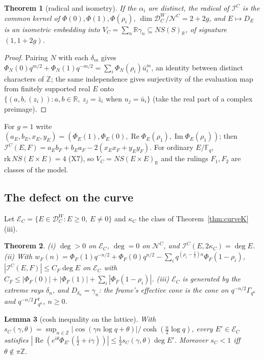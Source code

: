 \documentclass[11pt]{amsart}
\newtheorem{theorem}{Theorem}[section]
\newtheorem{lemma}[theorem]{Lemma}
\theoremstyle{definition}
\theoremstyle{remark}
\newcommand{\R}{\mathbb R}
\newcommand{\Z}{\mathbb Z}
\newcommand{\F}{\mathbb F}
\newcommand{\Rel}{\operatorname{Re}}
\newcommand{\Iml}{\operatorname{Im}}
\newcommand{\DW}{\mathcal D^{W}}
\newcommand{\Nr}{\mathcal N}
\newcommand{\Ef}{\mathcal E}
\newcommand{\I}{\mathcal I}
\newcommand{\dg}{\deg}
\newcommand{\Kc}{\kappa_C}
\begin{document}
\begin{theorem}[radical and isometry]\label{thm:curverad}
If the $\alpha_i$ are distinct, the radical of $\I^C$ is the common kernel of $\Phi(0),\Phi(1),\Phi(\rho_i)$,
$\dim\DW_C/\Nr^C=2+2g$, and $E\mapsto D_E$ is an isometric embedding into $V_C=\sum_n\R\gamma_n\subseteq NS(S)_\R$,
of signature $(1,1+2g)$.
\end{theorem}
\begin{proof}
Pairing $N$ with each $\delta_m$ gives $\Phi_N(0)q^{m/2}+\Phi_N(1)q^{-m/2}=\sum_i\Phi_N(\rho_i)\bar u_i^m$, an identity
between distinct characters of $\Z$; the same independence gives surjectivity of the evaluation map from finitely supported real $E$ onto $\{(a,b,(z_i)):a,b\in\R,\ z_j=\bar z_i\text{ when }u_j=\bar u_i\}$ (take the real part of a complex preimage).
\end{proof}

For $g=1$ write $(a_E,b_E,x_E,y_E)=(\Phi_E(1),\Phi_E(0),\Rel\Phi_E(\rho_1),\Iml\Phi_E(\rho_1))$; then
$\I^C(E,F)=a_Eb_F+b_Ea_F-2(x_Ex_F+y_Ey_F)$. For ordinary $E/\F_q$, $\mathrm{rk}\,NS(E\times E)=4$ (X7), so
$V_C=NS(E\times E)_\R$ and the rulings $F_1,F_2$ are classes of the model.

\subsection{The defect on the curve}
Let $\Ef_C=\{E\in\DW_C:E\ge0,\ E\ne0\}$ and $\Kc$ the class of Theorem~\ref{thm:curveK}(iii).

\begin{theorem}\label{thm:curveE}
(i) $\dg>0$ on $\Ef_C$, $\dg=0$ on $\Nr^C$, and $\I^C(E,2\Kc)=\dg E$. (ii) With
$w_F(n)=\Phi_F(1)q^{-n/2}+\Phi_F(0)q^{n/2}-\sum_iq^{(\rho_i-\frac12)n}\Phi_F(1-\rho_i)$, $|\I^C(E,F)|\le C_F\dg E$ on $\Ef_C$
with $C_F\le|\Phi_F(0)|+|\Phi_F(1)|+\sum_i|\Phi_F(1-\rho_i)|$. (iii) $\Ef_C$ is generated by the extreme rays $\delta_n$, and
$D_{\delta_n}=\gamma_n$: the frame's effective cone is the cone on $q^{-n/2}\Gamma_{q^n}$ and $q^{-n/2}\Gamma_{q^n}^t$, $n\ge0$.
\end{theorem}

\begin{lemma}[cosh inequality on the lattice]\label{lem:curvecosh}
With $s_C(\gamma,\theta)=\sup_{n\in\Z}|\cos(\gamma n\log q+\theta)|/\cosh(\frac n2\log q)$, every $E'\in\Ef_C$ satisfies
$|\Rel(e^{i\theta}\Phi_{E'}(\frac12+i\gamma))|\le\frac12s_C(\gamma,\theta)\dg E'$. Moreover $s_C<1$ iff $\theta\notin\pi\Z$.
\end{lemma}
\end{document}
